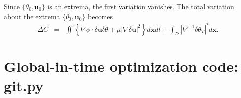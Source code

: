 \begin{flushleft}
Since $\{\theta_{0},\mathbf{u}_{0}\}$ is an extrema, the first variation vanishes. The total variation about the extrema $\{\theta_{0},\mathbf{u}_{0}\}$  becomes
  \begin{eqnarray}
  	\label{eq:total_Variation}
 	\Delta C&=& \iint \left\{\nabla\phi\cdot\delta\mathbf{u}\delta \theta 
			 +\mu |\nabla\delta \mathbf{u}|^{2}  
  		\right\}d\mathbf{x}dt +\int_{D}
  			|\nabla^{-1} 
			\delta\theta_{T}|^{2}
	      d\mathbf{x}.	
\end{eqnarray}
%

\end{flushleft}


\section{Global-in-time optimization code: git.py}
\label{app:git_code}



